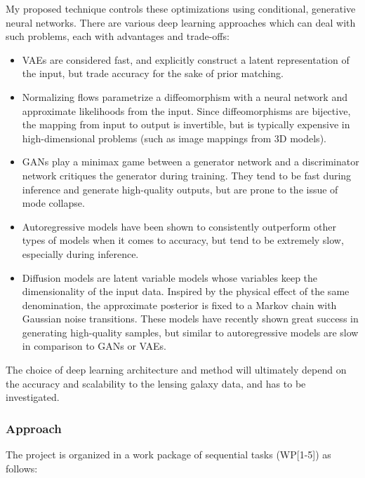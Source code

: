 \documentclass[a4paper,10pt]{article}
\begin{document}
My proposed technique controls these optimizations using conditional,
generative neural networks. There are various deep learning approaches
which can deal with such problems, each with advantages and
trade-offs:
\begin{itemize}[leftmargin=*, noitemsep]
\item VAEs \citep{Kingma13} are considered fast, and explicitly
construct a latent representation of the input, but trade accuracy
for the sake of prior matching.
\item Normalizing flows \citep{Rezende15} parametrize a diffeomorphism
with a neural network and approximate likelihoods from the
input. Since diffeomorphisms are bijective, the mapping from input
to output is invertible, but is typically expensive in
high-dimensional problems (such as image mappings from 3D models).
\item GANs \citep{Goodfellow14} play a minimax game between a generator
network and a discriminator network critiques the generator during
training. They tend to be fast during inference and generate
high-quality outputs, but are prone to the issue of mode collapse.
\item Autoregressive models \citep{Parmar18} have been shown to consistently outperform
other types of models when it comes to accuracy, but tend to be
extremely slow, especially during inference.
\item Diffusion models \citep{Sohl-Dickstein15,Ho20} are latent
variable models whose variables keep the dimensionality of the input
data. Inspired by the physical effect of the same denomination, the
approximate posterior is fixed to a Markov chain with Gaussian noise
transitions. These models have recently shown great success in
generating high-quality samples, but similar to autoregressive
models are slow in comparison to GANs or VAEs.
\end{itemize}

The choice of deep learning architecture and method will ultimately
depend on the accuracy and scalability to the lensing galaxy data, and
has to be investigated.

\subsubsection{Approach}
\label{sec:orgdcf4394}

The project is organized in a work package of sequential tasks
(WP[1-5]) as follows:
\end{document}

